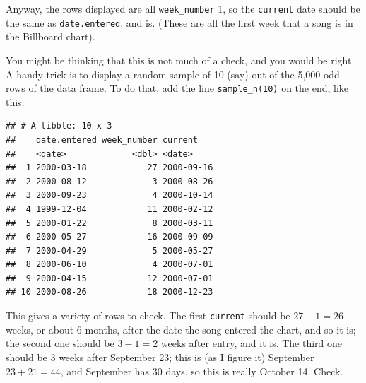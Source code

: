 \documentclass[]{tufte-book}
\newenvironment{Shaded}{}{}
\newcommand{\DataTypeTok}[1]{\textcolor[rgb]{0.56,0.13,0.00}{#1}}
\newcommand{\DecValTok}[1]{\textcolor[rgb]{0.25,0.63,0.44}{#1}}
\newcommand{\KeywordTok}[1]{\textcolor[rgb]{0.00,0.44,0.13}{\textbf{#1}}}
\newcommand{\NormalTok}[1]{#1}
\newcommand{\OperatorTok}[1]{\textcolor[rgb]{0.40,0.40,0.40}{#1}}
\newcommand{\StringTok}[1]{\textcolor[rgb]{0.25,0.44,0.63}{#1}}
\theoremstyle{definition}
\theoremstyle{definition}
\theoremstyle{definition}
\theoremstyle{remark}
\begin{document}
Anyway, the rows displayed are all \texttt{week\_number} 1, so the
\texttt{current} date should be the same as \texttt{date.entered}, and
is. (These are all the first week that a song is in the Billboard
chart).

You might be thinking that this is not much of a check, and you would be
right. A handy trick is to display a random sample of 10 (say) out of
the 5,000-odd rows of the data frame. To do that, add the line
\texttt{sample\_n(10)} on the end, like this:

\begin{Shaded}
\end{Shaded}

\begin{verbatim}
## # A tibble: 10 x 3
##    date.entered week_number current   
##    <date>             <dbl> <date>    
##  1 2000-03-18            27 2000-09-16
##  2 2000-08-12             3 2000-08-26
##  3 2000-09-23             4 2000-10-14
##  4 1999-12-04            11 2000-02-12
##  5 2000-01-22             8 2000-03-11
##  6 2000-05-27            16 2000-09-09
##  7 2000-04-29             5 2000-05-27
##  8 2000-06-10             4 2000-07-01
##  9 2000-04-15            12 2000-07-01
## 10 2000-08-26            18 2000-12-23
\end{verbatim}

This gives a variety of rows to check. The first \texttt{current} should
be \(27-1=26\) weeks, or about 6 months, after the date the song entered
the chart, and so it is; the second one should be \(3-1=2\) weeks after
entry, and it is. The third one should be 3 weeks after September 23;
this is (as I figure it) September \(23+21=44\), and September has 30
days, so this is really October 14. Check.
\end{document}

